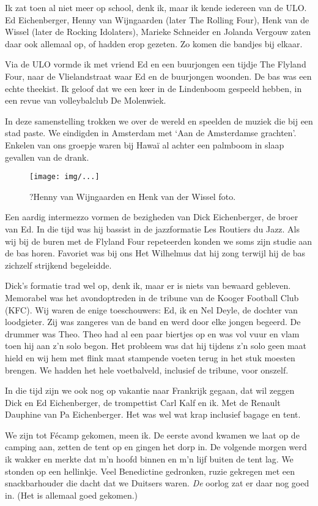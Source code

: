 \documentclass[10pt,twoside,openright]{memoir}
\begin{document}
Ik zat toen al niet meer op school, denk ik, maar ik kende iedereen van de ULO. Ed Eichenberger, Henny van Wijngaarden (later The Rolling Four), Henk van de Wissel (later de Rocking Idolaters), Marieke Schneider en Jolanda Vergouw zaten daar ook allemaal op, of hadden erop gezeten. Zo komen die bandjes bij elkaar.

Via de ULO vormde ik met vriend Ed en een buurjongen een tijdje The Flyland Four, naar de Vlielandstraat waar Ed en de buurjongen woonden. De bas was een echte theekist. Ik geloof dat we een keer in de Lindenboom gespeeld hebben, in een revue van volleybalclub De Molenwiek. 

In deze samenstelling trokken we over de wereld en speelden de muziek die bij een stad paste. We eindigden in Amsterdam met `Aan de Amsterdamse grachten'. Enkelen van ons groepje waren bij Hawaï al achter een palmboom in slaap gevallen van de drank. 

\begin{figure}[t]
\texttt{[image: img/...]}
\caption{?Henny van Wijngaarden en Henk van der Wissel foto.}
\end{figure}  

Een aardig intermezzo vormen de bezigheden van Dick Eichenberger, de broer van Ed. In die tijd was hij bassist in de jazzformatie Les Routiers du Jazz. Als wij bij de buren met de Flyland Four repeteerden konden we soms zijn studie aan de bas horen. Favoriet was bij ons Het Wilhelmus dat hij zong terwijl hij de bas zichzelf strijkend begeleidde. 

Dick's formatie trad wel op, denk ik, maar er is niets van bewaard gebleven. Memorabel was het avondoptreden in de tribune van de Kooger Football Club (KFC). Wij waren de enige toeschouwers: Ed, ik en Nel Deyle, de dochter van loodgieter. Zij was zangeres van de band en werd door elke jongen begeerd. De drummer was Theo. Theo had al een paar biertjes op en was vol vuur en vlam toen hij aan z’n solo begon. Het probleem was dat hij tijdens z’n solo geen maat hield en wij hem met flink maat stampende voeten terug in het stuk moesten brengen. We hadden het hele voetbalveld, inclusief de tribune, voor onszelf. 

In die tijd zijn we ook nog op vakantie naar Frankrijk gegaan, dat wil zeggen Dick en Ed Eichenberger, de trompettist Carl Kalf en ik. Met de Renault Dauphine van Pa Eichenberger. Het was wel wat krap inclusief bagage en tent. 

We zijn tot Fécamp gekomen, meen ik. De eerste avond kwamen we laat op de camping aan, zetten de tent op en gingen het dorp in. De volgende morgen werd ik wakker en merkte dat m’n hoofd binnen en m'n lijf buiten de tent lag. We stonden op een hellinkje. Veel Benedictine gedronken, ruzie gekregen met een snackbarhouder die dacht dat we Duitsers waren. \emph{De} oorlog zat er daar nog goed in. (Het is allemaal goed gekomen.)
\end{document}
